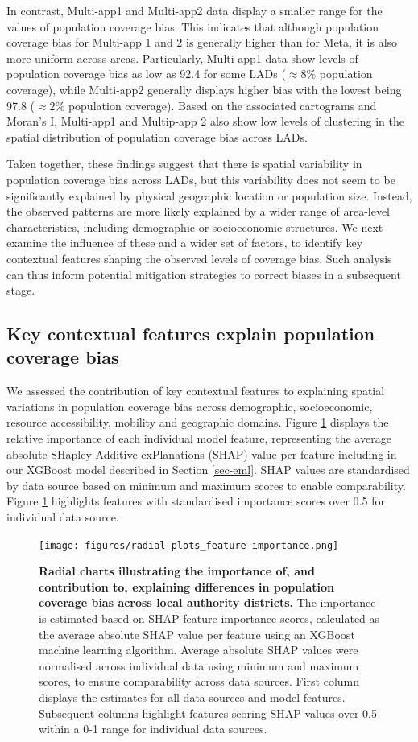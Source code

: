 \documentclass[]{rsos}%
\begin{document}
In contrast, Multi-app1 and
Multi-app2 data display a smaller range for the values of population coverage bias. This indicates that although population coverage bias for Multi-app 1 and 2 is generally higher than for Meta, it is also more uniform across areas.
Particularly, Multi-app1 data show levels of population
coverage bias as low as 92.4 for some LADs (\(\approx 8 \%\) population
coverage), while Multi-app2 generally displays higher bias with the lowest being 97.8 (\(\approx 2\%\) population coverage).
Based on the associated cartograms and Moran's I, Multi-app1 and Multip-app 2 also show low levels of clustering in the spatial distribution of population coverage bias across LADs.

Taken together, these findings suggest that there is spatial
variability in population coverage bias across LADs, but this variability does not seem to be
significantly explained by physical geographic location or population size.
Instead, the observed patterns are more likely explained by a wider range of
area-level characteristics, including demographic or socioeconomic
structures. We next examine the influence of these and a wider set of factors, to identify key contextual features shaping the observed levels of coverage bias. Such analysis can thus inform potential mitigation strategies to correct biases in a subsequent stage.

\subsection{Key contextual features explain population coverage bias}\label{sec-explain}

We assessed the contribution of key contextual features to explaining
spatial variations in population coverage bias across demographic,
socioeconomic, resource accessibility, mobility and geographic domains.
Figure \ref{fig:radialplots} displays the relative importance of each
individual model feature, representing the average absolute SHapley
Additive exPlanations (SHAP) value per feature including in our XGBoost
model described in Section \ref{sec-eml}. SHAP values are
standardised by data source based on minimum and maximum scores to
enable comparability. Figure \ref{fig:radialplots} highlights features
with standardised importance scores over 0.5 for individual data source.

\begin{figure}
\centering
\texttt{[image: figures/radial-plots\_feature-importance.png]}
\caption{\textbf{Radial charts illustrating the importance of, and contribution to,
explaining differences in population coverage bias across local authority
districts.} The importance is estimated based on SHAP feature
importance scores, calculated as the average absolute SHAP value per
feature using an XGBoost machine learning algorithm. Average absolute
SHAP values were normalised across individual data using minimum and
maximum scores, to ensure comparability across data sources. First
column displays the estimates for all data sources and model features.
Subsequent columns highlight features scoring SHAP values over 0.5
within a 0-1 range for individual data
sources.}\label{fig:radialplots}
\end{figure}
\end{document}
